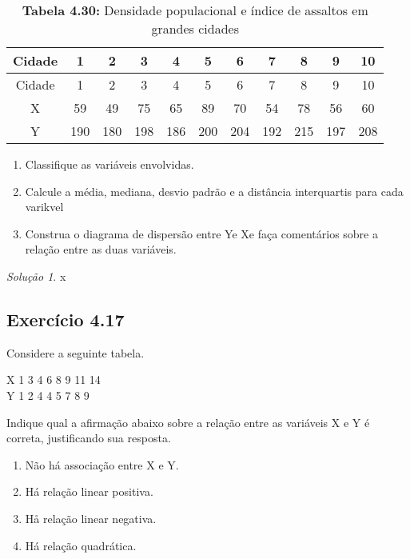 \documentclass[
]{latex/krantz}
\providecommand{\tightlist}{%
  \setlength{\itemsep}{0pt}\setlength{\parskip}{0pt}}
\theoremstyle{definition}
\theoremstyle{definition}
\theoremstyle{definition}
\theoremstyle{definition}
\theoremstyle{remark}
\newtheorem*{solution}{Solução}
\begin{document}
\begin{longtable}[]{@{}ccccccccccc@{}}
\caption{\textbf{Tabela 4.30:} Densidade populacional e índice de assaltos em grandes cidades}\tabularnewline
\toprule\noalign{}
Cidade & 1 & 2 & 3 & 4 & 5 & 6 & 7 & 8 & 9 & 10 \\
\midrule\noalign{}
\endfirsthead
\toprule\noalign{}
Cidade & 1 & 2 & 3 & 4 & 5 & 6 & 7 & 8 & 9 & 10 \\
\midrule\noalign{}
\endhead
\bottomrule\noalign{}
\endlastfoot
X & 59 & 49 & 75 & 65 & 89 & 70 & 54 & 78 & 56 & 60 \\
Y & 190 & 180 & 198 & 186 & 200 & 204 & 192 & 215 & 197 & 208 \\
\end{longtable}

\begin{enumerate}
\def\labelenumi{\alph{enumi}.}
\tightlist
\item
  Classifique as variáveis envolvidas.
\item
  Calcule a média, mediana, desvio padrão e a distância interquartis para cada varikvel
\item
  Construa o diagrama de dispersão entre Ye Xe faça comentários sobre a relação entre as duas variáveis.
\end{enumerate}

\begin{solution}
x
\end{solution}

\hypertarget{exr4-17}{%
\subsection*{Exercício 4.17}\label{exr4-17}}

Considere a seguinte tabela.

X \textbar{} 1 \textbar{} 3 \textbar{} 4 \textbar{} 6 \textbar{} 8 \textbar{} 9 \textbar{} 11 \textbar{} 14 \textbar{}\\
Y \textbar{} 1 \textbar{} 2 \textbar{} 4 \textbar{} 4 \textbar{} 5 \textbar{} 7 \textbar{} 8 \textbar{} 9 \textbar{}

Indique qual a afirmação abaixo sobre a relação entre as variáveis X e Y é correta, justificando sua resposta.

\begin{enumerate}
\def\labelenumi{\alph{enumi})}
\tightlist
\item
  Não há associação entre X e Y.
\item
  Há relação linear positiva.
\item
  Hå relação linear negativa.
\item
  Há relação quadrática.
\end{enumerate}
\end{document}
